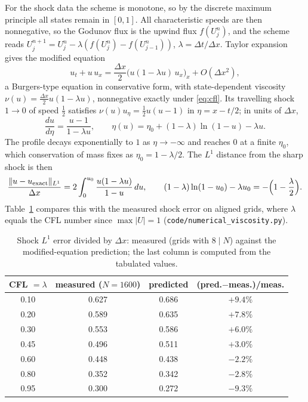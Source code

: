For the shock data the scheme is monotone, so by the discrete maximum principle
all states remain in $[0,1]$. All characteristic speeds are then nonnegative, so
the Godunov flux is the upwind flux $f(U_j^n)$, and the scheme reads
$U_j^{n+1}=U_j^n-\lambda(f(U_j^n)-f(U_{j-1}^n))$, $\lambda=\Delta t/\Delta x$.
Taylor expansion gives the modified equation
\begin{equation}
  \label{eq:modified-equation}
  u_t+u\,u_x=\frac{\Delta x}{2}\big(u(1-\lambda u)\,u_x\big)_x+O(\Delta x^2),
\end{equation}
a Burgers-type equation in conservative form, with state-dependent viscosity
$\nu(u)=\tfrac{\Delta x}2u(1-\lambda u)$, nonnegative exactly under
\eqref{eq:cfl}. Its travelling shock $1\to0$ of speed $\tfrac12$ satisfies
$\nu(u)u_\eta=\tfrac12u(u-1)$ in $\eta=x-t/2$; in units of $\Delta x$,
\begin{equation}
  \frac{du}{d\eta}=\frac{u-1}{1-\lambda u},\qquad
  \eta(u)=\eta_0+(1-\lambda)\ln(1-u)-\lambda u .
\end{equation}
The profile decays exponentially to $1$ as $\eta\to-\infty$ and reaches $0$ at
a finite $\eta_0$, which conservation of mass fixes as $\eta_0=1-\lambda/2$. The
$L^1$ distance from the sharp shock is then
\begin{equation}
  \frac{\|u-u_{\rm exact}\|_{L^1}}{\Delta x}
  =2\int_0^{u_0}\frac{u(1-\lambda u)}{1-u}\,du,\qquad
  (1-\lambda)\ln(1-u_0)-\lambda u_0=-\Big(1-\frac\lambda2\Big).
\end{equation}
Table~\ref{tab:numerical-viscosity} compares this with the measured shock
error on aligned grids, where $\lambda$ equals the CFL number since
$\max|U|=1$ (\texttt{code/numerical\_viscosity.py}).

\begin{table}[h]
\centering
\begin{tabular}{c c c c}
  CFL $=\lambda$ & measured ($N=1600$) & predicted & (pred.$-$meas.)/meas. \\\hline
  0.10 & 0.627 & 0.686 & $+9.4\%$ \\
  0.20 & 0.589 & 0.635 & $+7.8\%$ \\
  0.30 & 0.553 & 0.586 & $+6.0\%$ \\
  0.45 & 0.496 & 0.511 & $+3.0\%$ \\
  0.60 & 0.448 & 0.438 & $-2.2\%$ \\
  0.80 & 0.352 & 0.342 & $-2.8\%$ \\
  0.95 & 0.300 & 0.272 & $-9.3\%$
\end{tabular}
\caption{Shock $L^1$ error divided by $\Delta x$: measured (grids with
$8\mid N$) against the modified-equation prediction; the last column is computed from the tabulated values.}
\label{tab:numerical-viscosity}
\end{table}

